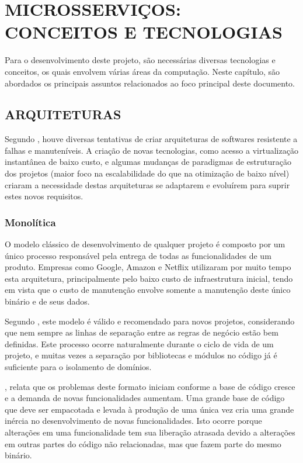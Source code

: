 \chapter{MICROSSERVIÇOS: CONCEITOS E TECNOLOGIAS}
\label{chp:tecnologias}

Para o desenvolvimento deste projeto, são necessárias diversas tecnologias e
conceitos, os quais envolvem várias áreas da computação. Neste capítulo, são
abordados os principais assuntos relacionados ao foco principal deste documento.

\section{ARQUITETURAS}

Segundo , houve diversas tentativas de criar
arquiteturas de softwares resistente a falhas e manuteníveis. A criação de
novas tecnologias, como acesso a virtualização instantânea de baixo custo,
e algumas mudanças de paradigmas de estruturação dos projetos (maior foco
na escalabilidade do que na otimização de baixo nível) criaram a
necessidade destas arquiteturas se adaptarem e evoluírem para suprir estes
novos requisitos.

\subsection{Monolítica}

O modelo clássico de desenvolvimento de qualquer projeto é composto por um
único processo responsável pela entrega de todas as funcionalidades de um
produto. Empresas como Google, Amazon e Netflix utilizaram por muito tempo
esta arquitetura, principalmente pelo baixo custo de infraestrutura inicial,
tendo em vista que o custo de manutenção envolve somente a manutenção deste
único binário e de seus dados.

Segundo , este modelo é válido e recomendado para novos
projetos, considerando que nem sempre as linhas de separação entre as regras
de negócio estão bem definidas. Este processo ocorre naturalmente durante o
ciclo de vida de um projeto, e muitas vezes a separação por bibliotecas e
módulos no código já é suficiente para o isolamento de domínios.

, relata que os problemas deste formato iniciam conforme
a base de código cresce e a demanda de novas funcionalidades aumentam. Uma
grande base de código que deve ser empacotada e levada à produção de uma
única vez cria uma grande inércia no desenvolvimento de novas
funcionalidades. Isto ocorre porque alterações em uma funcionalidade tem
sua liberação atrasada devido a alterações em outras partes do código não
relacionadas, mas que fazem parte do mesmo binário.

